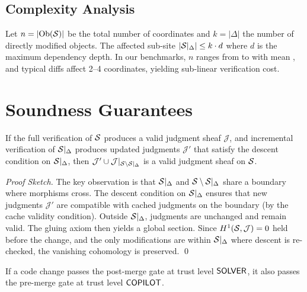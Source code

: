\documentclass[11pt]{article}
\begin{document}
\subsection{Complexity Analysis}

Let $n = |\mathrm{Ob}(\mathcal{S})|$ be the total number of coordinates and $k = |\Delta|$
the number of directly modified objects. The affected sub-site
$|\mathcal{S}|_\Delta| \leq k \cdot d$ where $d$ is the maximum dependency depth.
In our benchmarks, $n$ ranges from \compCoordsMin{} to \compCoordsMax{} with
mean \compCoordsMean{}, and typical diffs affect 2--4 coordinates, yielding
sub-linear verification cost.

\section{Soundness Guarantees}\label{sec:soundness}

\begin{theorem}\label{thm:incremental-sound}
If the full verification of $\mathcal{S}$ produces a valid judgment sheaf
$\mathcal{J}$, and incremental verification of $\mathcal{S}|_\Delta$ produces
updated judgments $\mathcal{J}'$ that satisfy the descent condition on
$\mathcal{S}|_\Delta$, then $\mathcal{J}' \cup \mathcal{J}|_{\mathcal{S} \setminus
\mathcal{S}|_\Delta}$ is a valid judgment sheaf on $\mathcal{S}$.
\end{theorem}

\begin{proof}[Proof Sketch]
The key observation is that $\mathcal{S}|_\Delta$ and $\mathcal{S} \setminus \mathcal{S}|_\Delta$
share a boundary where morphisms cross. The descent condition on
$\mathcal{S}|_\Delta$ ensures that new judgments $\mathcal{J}'$ are compatible with
cached judgments on the boundary (by the cache validity condition). Outside
$\mathcal{S}|_\Delta$, judgments are unchanged and remain valid. The gluing axiom
then yields a global section. Since $H^{1}(\mathcal{S}, \mathcal{J}) = 0$ held
before the change, and the only modifications are within $\mathcal{S}|_\Delta$ where
descent is re-checked, the vanishing cohomology is preserved. \qed
\end{proof}

\begin{theorem}\label{thm:gate-mono}
If a code change passes the post-merge gate at trust level $\mathsf{SOLVER}$,
it also passes the pre-merge gate at trust level $\mathsf{COPILOT}$.
\end{theorem}
\end{document}
